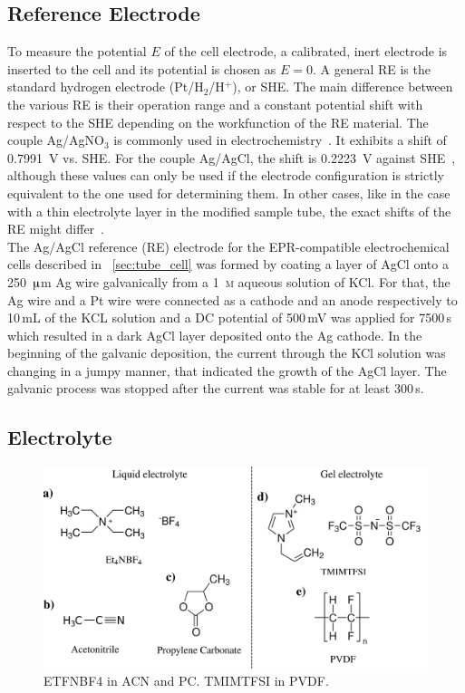 \subsection{Reference Electrode}
To measure the potential $E$ of the cell electrode, a calibrated, inert electrode is inserted to the cell and its potential is chosen as $E=0$. A general RE is the standard hydrogen electrode (Pt/H$_2$/H$^+$), or SHE. The main difference between the various RE is their operation range and a constant potential shift with respect to the SHE depending on the workfunction of the RE material. The couple Ag/AgNO$_3$ is commonly used in electrochemistry~\cite{Bard_book}. It exhibits a shift of 0.7991~V vs. SHE. For the couple Ag/AgCl, the shift is 0.2223~V against SHE~\cite{Bard_book,DOM}, although these values can only be used if the electrode configuration is strictly equivalent to the one used for determining them. In other cases, like in the case with a thin electrolyte layer in the modified sample tube, the exact shifts of the RE might differ~\cite{DOM}.\\


The Ag/AgCl reference (RE) electrode for the EPR-compatible electrochemical cells described in ~\ref{sec:tube_cell} was formed by coating a layer of AgCl onto a 250~$\muup$m Ag wire galvanically from a 1~\textsc{m} aqueous solution of KCl. For that, the Ag wire and a Pt wire were connected as a cathode and an anode respectively to 10$\,$mL of the KCL solution and a DC potential of 500$\,$mV was applied for 7500$\,$s which resulted in a dark AgCl layer deposited onto the Ag cathode. In the beginning of the galvanic deposition, the current through the KCl solution was changing in a jumpy manner, that indicated the growth of the AgCl layer. The galvanic process was stopped after the current was stable for at least 300$\,$s.\\

\subsection{Electrolyte}
\begin{figure}[h]
\center
	\includegraphics[width=1\textwidth]{./electrochemistry/figures/materials/electrolytes.pdf}
	\caption{ETFNBF4 in ACN and PC. TMIMTFSI in PVDF.}
	\label{fig:electrolytes}
\end{figure}

